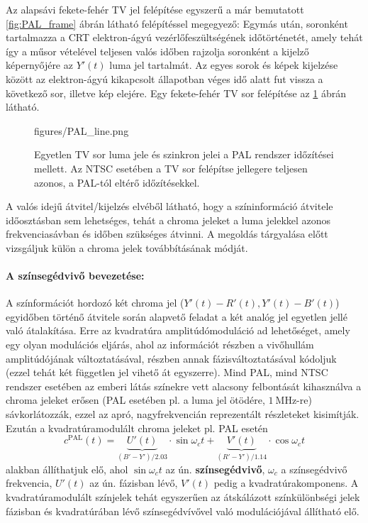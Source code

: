 Az alapsávi fekete-fehér TV jel felépítése egyszerű a már bemutatott \ref{fig:PAL_frame} ábrán látható felépítéssel megegyező:
Egymás után, soronként tartalmazza a CRT elektron-ágyú vezérlőfeszültségének időtörténetét, amely tehát így a műsor vételével teljesen valós időben rajzolja soronként a kijelző képernyőjére az $Y'(t)$ luma jel tartalmát.
Az egyes sorok és képek kijelzése között az elektron-ágyú kikapcsolt állapotban véges idő alatt fut vissza a következő sor, illetve kép elejére. 
Egy fekete-fehér TV sor felépítése az \ref{Fig:PAL_line} ábrán látható.

%
\begin{figure}[]
	\centering
	\begin{minipage}[c]{0.65\textwidth}
	\begin{overpic}[width = 0.95\columnwidth ]{figures/PAL_line.png}
	\end{overpic} \end{minipage}\hfill
	\begin{minipage}[c]{0.35\textwidth}	\caption{Egyetlen TV sor luma jele és szinkron jelei a PAL rendszer időzítései mellett. Az NTSC esetében a TV sor felépítse jellegere teljesen azonos, a PAL-tól eltérő időzítésekkel.}
	\label{Fig:PAL_line}  \end{minipage}
\end{figure}
%

A valós idejű átvitel/kijelzés elvéből látható, hogy a színinformáció átvitele időosztásban sem lehetséges, tehát a chroma jeleket a luma jelekkel azonos frekvenciasávban és időben szükséges átvinni.
A megoldás tárgyalása előtt vizsgáljuk külön a chroma jelek továbbításának módját.

\paragraph{A színsegédvivő bevezetése:}
A színformációt hordozó két chroma jel ($Y'(t)-R'(t), Y'(t)-B'(t)$) egyidőben történő átvitele során alapvető feladat a két analóg jel egyetlen jellé való átalakítása.
Erre az kvadratúra amplitúdómoduláció ad lehetőséget, amely egy olyan modulációs eljárás, ahol az információt részben a vivőhullám amplitúdójának változtatásával, részben annak fázisváltoztatásával kódoljuk (ezzel tehát két független jel vihető át egyszerre). 
Mind PAL, mind NTSC rendszer esetében az emberi látás színekre vett alacsony felbontását kihasználva a chroma jeleket erősen (PAL esetében pl. a luma jel ötödére, $1~\mathrm{MHz}$-re) sávkorlátozzák, ezzel az apró, nagyfrekvencián reprezentált részleteket kisimítják. 
Ezután a kvadratúramodulált chroma jeleket pl. PAL esetén
\begin{equation}
c^{\mathrm{PAL}}(t) = \underbrace{U'(t)}_{\left( B'- Y'\right) / 2.03} \cdot \sin \omega_c t + \underbrace{V'(t)}_{\left( R'- Y'\right) / 1.14}  \cdot \cos \omega_c t
\label{Eq:PAL_cr}
\end{equation}
alakban állíthatjuk elő, ahol $\sin \omega_c t$ az ún. \textbf{színsegédvivő}, $\omega_c$ a színsegédvivő frekvencia, $U'(t)$ az ún. fázisban lévő, $V'(t)$ pedig a kvadratúrakomponens.
A kvadratúramodulált színjelek tehát egyszerűen az átskálázott színkülönbségi jelek fázisban és kvadratúrában lévő színsegédvívővel való modulációjával állítható elő.

